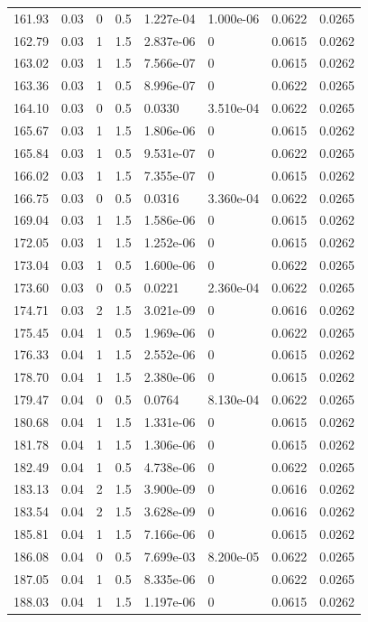 \documentclass[preview]{standalone}
\begin{document}
{{{\begin{tabular}{L{1.2cm}C{1.2cm} C{0.3cm}C{0.5cm} C{1.4cm}C{1.4cm} C{1.4cm}C{1.4cm}}
  161.93  &  0.03  & 0     & 0.5 &  1.227e-04  & 1.000e-06  & 0.0622 &  0.0265   \\ 
  162.79  &  0.03  & 1     & 1.5 &  2.837e-06  & 0  & 0.0615 &  0.0262   \\ 
  163.02  &  0.03  & 1     & 1.5 &  7.566e-07  & 0  & 0.0615 &  0.0262   \\ 
  163.36  &  0.03  & 1     & 0.5 &  8.996e-07  & 0  & 0.0622 &  0.0265   \\ 
  164.10  &  0.03  & 0     & 0.5 &  0.0330  & 3.510e-04  & 0.0622 &  0.0265   \\ 
  165.67  &  0.03  & 1     & 1.5 &  1.806e-06  & 0  & 0.0615 &  0.0262   \\ 
  165.84  &  0.03  & 1     & 0.5 &  9.531e-07  & 0  & 0.0622 &  0.0265   \\ 
  166.02  &  0.03  & 1     & 1.5 &  7.355e-07  & 0  & 0.0615 &  0.0262   \\ 
  166.75  &  0.03  & 0     & 0.5 &  0.0316  & 3.360e-04  & 0.0622 &  0.0265   \\ 
  169.04  &  0.03  & 1     & 1.5 &  1.586e-06  & 0  & 0.0615 &  0.0262   \\ 
  172.05  &  0.03  & 1     & 1.5 &  1.252e-06  & 0  & 0.0615 &  0.0262   \\ 
  173.04  &  0.03  & 1     & 0.5 &  1.600e-06  & 0  & 0.0622 &  0.0265   \\ 
  173.60  &  0.03  & 0     & 0.5 &  0.0221  & 2.360e-04  & 0.0622 &  0.0265   \\ 
  174.71  &  0.03  & 2     & 1.5 &  3.021e-09  & 0  & 0.0616 &  0.0262   \\ 
  175.45  &  0.04  & 1     & 0.5 &  1.969e-06  & 0  & 0.0622 &  0.0265   \\ 
  176.33  &  0.04  & 1     & 1.5 &  2.552e-06  & 0  & 0.0615 &  0.0262   \\ 
  178.70  &  0.04  & 1     & 1.5 &  2.380e-06  & 0  & 0.0615 &  0.0262   \\ 
  179.47  &  0.04  & 0     & 0.5 &  0.0764  & 8.130e-04  & 0.0622 &  0.0265   \\ 
  180.68  &  0.04  & 1     & 1.5 &  1.331e-06  & 0  & 0.0615 &  0.0262   \\ 
  181.78  &  0.04  & 1     & 1.5 &  1.306e-06  & 0  & 0.0615 &  0.0262   \\ 
  182.49  &  0.04  & 1     & 0.5 &  4.738e-06  & 0  & 0.0622 &  0.0265   \\ 
  183.13  &  0.04  & 2     & 1.5 &  3.900e-09  & 0  & 0.0616 &  0.0262   \\ 
  183.54  &  0.04  & 2     & 1.5 &  3.628e-09  & 0  & 0.0616 &  0.0262   \\ 
  185.81  &  0.04  & 1     & 1.5 &  7.166e-06  & 0  & 0.0615 &  0.0262   \\ 
  186.08  &  0.04  & 0     & 0.5 &  7.699e-03  & 8.200e-05  & 0.0622 &  0.0265   \\ 
  187.05  &  0.04  & 1     & 0.5 &  8.335e-06  & 0  & 0.0622 &  0.0265   \\ 
  188.03  &  0.04  & 1     & 1.5 &  1.197e-06  & 0  & 0.0615 &  0.0262   \\ 
\hline 
\end{tabular} 

}}}
\end{document}
